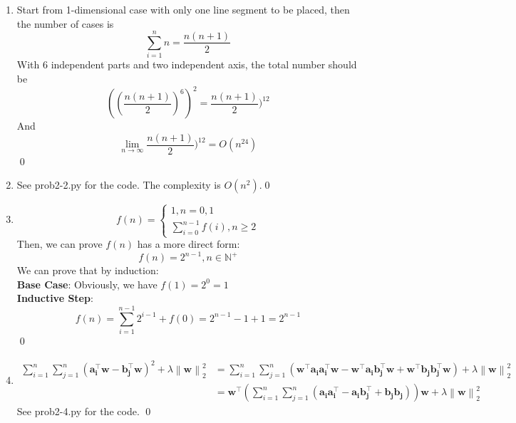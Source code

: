 \documentclass[12pt]{article}
\begin{document}
\begin{enumerate}[label=(\alph*)]
  \item 
    Start from 1-dimensional case with only one line segment to be placed, then the number of cases is
    \begin{equation}\sum_{i=1}^n n=\frac{n(n+1)}{2}\end{equation}
    With 6 independent parts and two independent axis, the total number should be
    \begin{equation}((\frac{n(n+1)}{2})^6)^2=\frac{n(n+1)}{2})^{12}\end{equation}
    And
    \begin{equation}\lim_{n\to\infty}\frac{n(n+1)}{2})^{12}=O(n^{24})\end{equation}\qed
    
  \item 
    See prob2-2.py for the code.
    The complexity is $O(n^2)$.\qed
    
  \item
    \begin{equation} f(n) = 
    \begin{cases} 
      1, n = 0, 1 \\
      \sum_{i=0}^{n-1}{f(i)}, n \ge 2
   \end{cases}
   \end{equation}
   Then, we can prove $f(n)$ has a more direct form: 
   \begin{equation}f(n) = 2^{n-1}, n \in \mathbb{N^+}\end{equation}
   We can prove that by induction: \\
   \textbf{Base Case}: Obviously, we have $f(1) = 2^0 = 1$ \\
   \textbf{Inductive Step}: 
   \begin{equation}f(n) = \sum_{i=1}^{n-1}2^{i-1}+f(0)=2^{n-1}-1+1=2^{n-1}\end{equation}\qed
   
 \item 
    \begin{align}\sum_{i=1}^{n}\sum_{j=1}^{n}{(\mathbf{a_i^\top w-b_j^\top w})}^2 + \lambda \left\lVert\mathbf{w}\right\rVert_2^2 &= \sum_{i=1}^{n}\sum_{j=1}^{n}{(\mathbf{w^\top a_i a_i^\top w-w^\top a_i b_j^\top w + w^\top b_j b_j^\top w})} + \lambda \left\lVert\mathbf{w}\right\rVert_2^2\\
    &= \mathbf{w^\top} (\sum_{i=1}^{n}\sum_{j=1}^{n}{(\mathbf{a_i a_i^\top-a_i b_j^\top+b_j b_j})}) \mathbf{w}+ \lambda \left\lVert\mathbf{w}\right\rVert_2^2\end{align}
    See prob2-4.py for the code. \qed
    
\end{enumerate}
\end{document}

